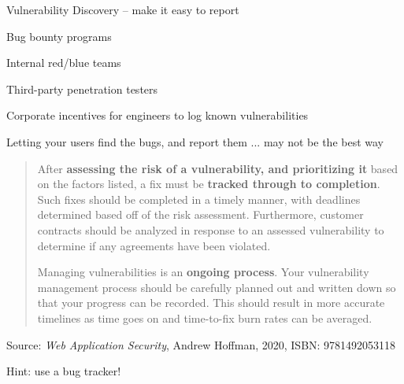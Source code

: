 \documentclass[Screen16to9,17pt]{foils}
\begin{document}
\begin{list2}
\item Vulnerability Discovery -- make it easy to report\\
\end{list2}




\begin{list2}
\item Bug bounty programs
\item Internal red/blue teams
\item Third-party penetration testers
\item Corporate incentives for engineers to log known vulnerabilities
\item Letting your users find the bugs, and report them ... may not be the best way
\end{list2}



\begin{quote}
After {\bf assessing the risk of a vulnerability, and prioritizing it} based on the factors listed, a fix must be {\bf tracked through to completion}. Such fixes should be completed in a timely manner, with deadlines determined based off of the risk assessment. Furthermore, customer contracts should be analyzed in response to an assessed vulnerability to determine if any agreements have been violated.

Managing vulnerabilities is an {\bf ongoing process}. Your vulnerability management process should be carefully planned out and written down so that your progress can be recorded. This should result in more accurate timelines as time goes on and time-to-fix burn rates can be averaged.
\end{quote}
Source: \emph{Web Application Security}, Andrew Hoffman, 2020, ISBN: 9781492053118

\begin{list2}
\item Hint: use a bug tracker!
\end{list2}




\end{document}
